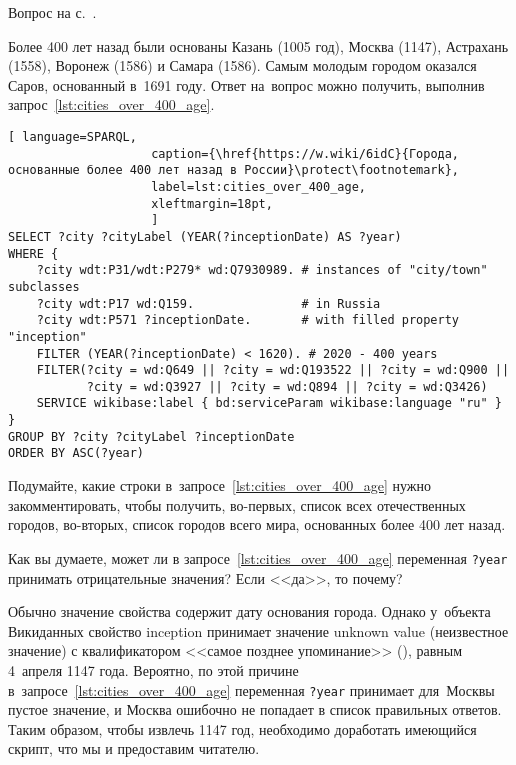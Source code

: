\begin{task}
    \label{answer:cities_over_400_age}
    \AnswerBackref Вопрос на с.~\pageref{fig:city_relation_Russia_S_N}.

    Более 400 лет назад были основаны Казань (1005 год), Москва (1147), 
    Астрахань (1558), Воронеж (1586) и Самара (1586). 
    Самым молодым городом оказался Саров, основанный в~1691 году. 
    Ответ на~вопрос можно получить, выполнив запрос~\ref{lst:cities_over_400_age}. 

   
    \newpage
    \begin{lstlisting}[ language=SPARQL, 
                    caption={\href{https://w.wiki/6idC}{Города, основанные более 400 лет назад в России}\protect\footnotemark},
                    label=lst:cities_over_400_age,
                    xleftmargin=18pt, 
                    ]
SELECT ?city ?cityLabel (YEAR(?inceptionDate) AS ?year) 
WHERE {
    ?city wdt:P31/wdt:P279* wd:Q7930989. # instances of "city/town" subclasses
    ?city wdt:P17 wd:Q159.               # in Russia
    ?city wdt:P571 ?inceptionDate.       # with filled property "inception"  
    FILTER (YEAR(?inceptionDate) < 1620). # 2020 - 400 years
    FILTER(?city = wd:Q649 || ?city = wd:Q193522 || ?city = wd:Q900 ||
           ?city = wd:Q3927 || ?city = wd:Q894 || ?city = wd:Q3426)
  	SERVICE wikibase:label { bd:serviceParam wikibase:language "ru" }
}
GROUP BY ?city ?cityLabel ?inceptionDate
ORDER BY ASC(?year)
\end{lstlisting}

Подумайте, какие строки в~запросе~\ref{lst:cities_over_400_age} нужно закомментировать, 
    чтобы получить, во-первых, список всех отечественных городов, 
    во-вторых, 
    список городов всего мира, основанных более 400 лет назад. 

Как вы думаете, может ли в запросе~\ref{lst:cities_over_400_age} 
    переменная \lstinline|?year| принимать отрицательные значения? 
    Если <<да>>, то почему?

    Обычно значение свойства 
    содержит дату%
 основания города. 
Однако у~объекта Викиданных  
    свойство inception 
    принимает значение unknown value (неизвестное значение) 
    с квалификатором <<самое позднее упоминание>> 
    (), равным 4~апреля 1147 года. 
    Вероятно, по этой причине в~запросе~\ref{lst:cities_over_400_age} 
    переменная \lstinline|?year| принимает для~Москвы пустое значение, 
    и Москва ошибочно не попадает в список правильных ответов. 
    Таким образом, чтобы извлечь 1147 год, 
    необходимо доработать имеющийся скрипт, что мы и предоставим читателю. 
\end{task}


